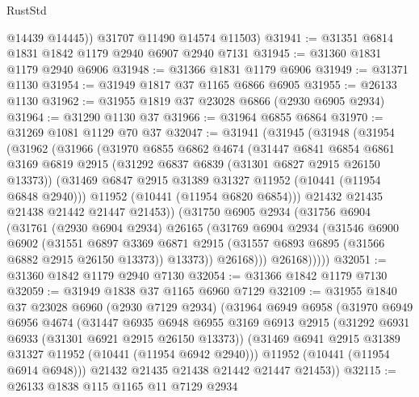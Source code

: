 \begin{lexlean}{RustStd}
\begin{coremodule}
          @14439
          @14445))
      @31707
      @11490
      @14574
      @11503)
@31941 := @31351 @6814 @1831 @1842 @1179 @2940 @6907 @2940 @7131
@31945 := @31360 @1831 @1179 @2940 @6906
@31948 := @31366 @1831 @1179 @6906
@31949 := @31371 @1130
@31954 := @31949 @1817 @37 @1165 @6866 @6905
@31955 := @26133 @1130
@31962 := @31955 @1819 @37 @23028 @6866 (@2930 @6905 @2934)
@31964 := @31290 @1130 @37
@31966 := @31964 @6855 @6864
@31970 := @31269 @1081 @1129 @70 @37
@32047 := @31941
    (@31945
      (@31948
        (@31954
          (@31962
            (@31966
              (@31970
                @6855
                @6862
                @4674
                (@31447
                  @6841
                  @6854
                  @6861
                  @3169
                  @6819
                  @2915
                  (@31292 @6837 @6839 (@31301 @6827 @2915 @26150 @13373))
                  (@31469 @6847 @2915 @31389 @31327 @11952 (@10441 (@11954 @6848 @2940)))
                  @11952
                  (@10441 (@11954 @6820 @6854)))
                @21432
                @21435
                @21438
                @21442
                @21447
                @21453))
            (@31750
              @6905
              @2934
              (@31756
                @6904
                (@31761
                  (@2930 @6904 @2934)
                  @26165
                  (@31769
                    @6904
                    @2934
                    (@31546
                      @6900
                      @6902
                      (@31551
                        @6897
                        @3369
                        @6871
                        @2915
                        (@31557 @6893 @6895 (@31566 @6882 @2915 @26150 @13373))
                        @13373))
                    @26168)))
              @26168)))))
@32051 := @31360 @1842 @1179 @2940 @7130
@32054 := @31366 @1842 @1179 @7130
@32059 := @31949 @1838 @37 @1165 @6960 @7129
@32109 := @31955
    @1840
    @37
    @23028
    @6960
    (@2930 @7129 @2934)
    (@31964
      @6949
      @6958
      (@31970
        @6949
        @6956
        @4674
        (@31447
          @6935
          @6948
          @6955
          @3169
          @6913
          @2915
          (@31292 @6931 @6933 (@31301 @6921 @2915 @26150 @13373))
          (@31469 @6941 @2915 @31389 @31327 @11952 (@10441 (@11954 @6942 @2940)))
          @11952
          (@10441 (@11954 @6914 @6948)))
        @21432
        @21435
        @21438
        @21442
        @21447
        @21453))
@32115 := @26133 @1838 @115 @1165 @11 @7129 @2934

\end{coremodule}
\end{lexlean}
